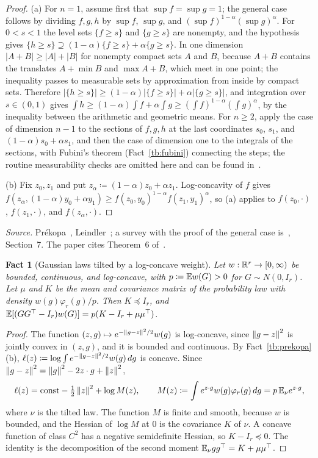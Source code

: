 \documentclass[11pt,letterpaper]{article}
\theoremstyle{plain}
\newtheorem{fact}{Fact}[section]
\begin{document}
\begin{proof}
(a) For \(n=1\), assume first that \(\sup f=\sup g=1\); the general case
follows by dividing \(f,g,h\) by \(\sup f\), \(\sup g\), and
\((\sup f)^{1-\alpha}(\sup g)^\alpha\). For \(0<s<1\) the level sets
\(\{f\ge s\}\) and \(\{g\ge s\}\) are nonempty, and the hypothesis gives
\(\{h\ge s\}\supseteq(1-\alpha)\{f\ge s\}+\alpha\{g\ge s\}\). In one dimension
\(|A+B|\ge|A|+|B|\) for nonempty compact sets \(A\) and \(B\), because
\(A+B\) contains the translates \(A+\min B\) and \(\max A+B\), which meet in
one point; the inequality passes to measurable sets by approximation from
inside by compact sets. Therefore
\(|\{h\ge s\}|\ge(1-\alpha)|\{f\ge s\}|+\alpha|\{g\ge s\}|\), and integration over
\(s\in(0,1)\) gives \(\int h\ge(1-\alpha)\int f+\alpha\int g\ge(\int f)^{1-\alpha}(\int g)^\alpha\),
by the inequality between the arithmetic and geometric means. For \(n\ge2\),
apply the case of dimension \(n-1\) to the sections of \(f,g,h\) at the last
coordinates \(s_0\), \(s_1\), and \((1-\alpha)s_0+\alpha s_1\), and then the case of
dimension one to the integrals of the sections, with Fubini's theorem
(Fact~\ref{tb:fubini}) connecting the steps; the routine measurability
checks are omitted here and can be found in~.

(b) Fix \(z_0,z_1\) and put \(z_\alpha\coloneqq (1-\alpha)z_0+\alpha z_1\). Log-concavity of \(f\)
gives \(f(z_\alpha,(1-\alpha)y_0+\alpha y_1)\ge f(z_0,y_0)^{1-\alpha}f(z_1,y_1)^\alpha\), so (a) applies
to \(f(z_0,\cdot)\), \(f(z_1,\cdot)\), and \(f(z_\alpha,\cdot)\).
\end{proof}

\emph{Source.} Pr\'ekopa~, Leindler~; a
survey with the proof of the general case is~, Section~7. The
paper cites Theorem~6 of~.

\begin{fact}[Gaussian laws tilted by a log-concave weight]\label{tb:tilt}
Let \(w:\mathbb R^r\to[0,\infty)\) be bounded, continuous, and log-concave, with
\(p\coloneqq \mathbb E w(G)>0\) for \(G\sim N(0,I_r)\). Let \(\mu\) and \(K\) be the mean and
covariance matrix of the probability law with density \(w(g)\varphi_r(g)/p\).
Then \(K\preceq I_r\), and
\(\mathbb E[(GG^\top-I_r)w(G)]=p(K-I_r+\mu\mu^\top)\).
\end{fact}

\begin{proof}
The function \((z,g)\mapsto e^{-\left\lVert g-z\right\rVert^2/2}w(g)\) is log-concave, since
\(\left\lVert g-z\right\rVert^2\) is jointly convex in \((z,g)\), and it is bounded and
continuous. By Fact~\ref{tb:prekopa}(b), \(\ell(z)\coloneqq \log\int e^{-\left\lVert g-z\right\rVert^2/2}
w(g)\,dg\) is concave. Since \(\left\lVert g-z\right\rVert^2=\left\lVert g\right\rVert^2-2z\cdot g+\left\lVert z\right\rVert^2\),
\[
 \ell(z)=\text{const}-\tfrac12\left\lVert z\right\rVert^2+\log M(z),\qquad
 M(z)\coloneqq \int e^{z\cdot g}w(g)\varphi_r(g)\,dg=p\,\mathbb E_\nu e^{z\cdot g},
\]
where \(\nu\) is the tilted law. The function \(M\) is finite and smooth,
because \(w\) is bounded, and the Hessian of \(\log M\) at \(0\) is the
covariance \(K\) of \(\nu\). A concave function of class \(C^2\) has a
negative semidefinite Hessian, so \(K-I_r\preceq0\). The identity is the
decomposition of the second moment \(\mathbb E_\nu gg^\top=K+\mu\mu^\top\).
\end{proof}
\end{document}
